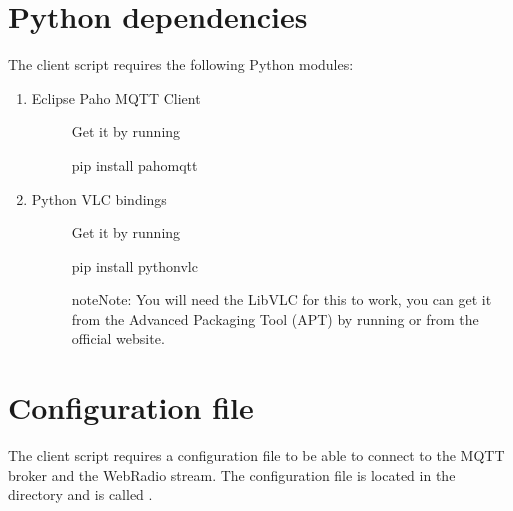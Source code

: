 \documentclass[letterpaper,10pt,english]{sphinxmanual}
\begin{document}
\section{Python dependencies}
\label{\detokenize{client_install:python-dependencies}}
\sphinxAtStartPar
The client script requires the following Python modules:
\begin{enumerate}
%
\item {} \begin{description}
\item[{Eclipse Paho MQTT Client}] \leavevmode
\sphinxAtStartPar
Get it by running 

\begin{sphinxVerbatim}[commandchars=\\\{\}]
pip install paho\PYGZhy{}mqtt
\end{sphinxVerbatim}

\end{description}

\item {} \begin{description}
\item[{Python VLC bindings}] \leavevmode
\sphinxAtStartPar
Get it by running 

\begin{sphinxVerbatim}[commandchars=\\\{\}]
pip install python\PYGZhy{}vlc
\end{sphinxVerbatim}

\begin{sphinxadmonition}{note}{Note:}
\sphinxAtStartPar
You will need the LibVLC for this to work, you can get it from the Advanced Packaging Tool (APT)
by running  or from the official website.
\end{sphinxadmonition}

\end{description}

\end{enumerate}


\section{Configuration file}
\label{\detokenize{client_install:configuration-file}}
\sphinxAtStartPar
The client script requires a configuration file to be able to connect to the MQTT broker and the WebRadio stream.
The configuration file is located in the  directory and is called .
\end{document}
